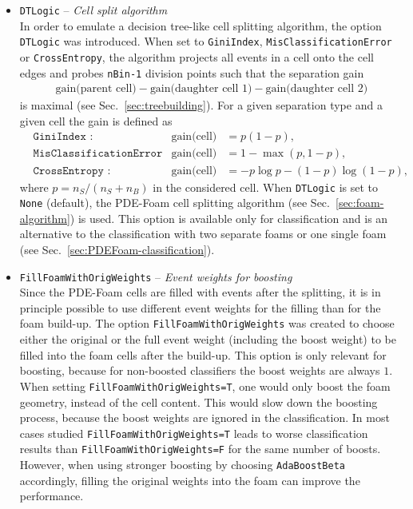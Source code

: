 \begin{itemize}
\item \texttt{DTLogic} -- {\em Cell split algorithm}\\
In order to emulate a decision tree-like cell splitting algorithm, the
option \texttt{DTLogic} was introduced.  When set to
\texttt{GiniIndex}, \texttt{MisClassificationError} or
\texttt{Cross\-En\-tro\-py}, the algorithm projects all events in a
cell onto the cell edges and probes \texttt{nBin-1} division points
such that the separation gain
\begin{align}
  \text{gain(parent cell)} -
  \text{gain(daughter cell 1)} 
  - \text{gain(daughter cell 2)}
\end{align}
is maximal (see Sec.~\ref{sec:treebuilding}).  For a given separation
type and a given cell the gain is defined as
\begin{align}
  &\texttt{GiniIndex :} & \text{gain(cell)}&=p(1-p),\\
  &\texttt{MisClassificationError :} & \text{gain(cell)}&=1-\max(p,1-p),\\
  &\texttt{CrossEntropy :} & \text{gain(cell)}&=-p\log p-(1-p)\log(1-p),
\end{align}
where $p=n_S/(n_S+n_B)$ in the considered cell.  When \texttt{DTLogic}
is set to \texttt{None} (default), the PDE-Foam cell splitting
algorithm (see Sec.~\ref{sec:foam-algorithm}) is used.  This option is
available only for classification and is an alternative to the
classification with two separate foams or one single foam (see
Sec.~\ref{sec:PDEFoam-classification}).


\item \texttt{FillFoamWithOrigWeights} -- {\em Event weights for boosting}\\
  Since the PDE-Foam cells are filled with events after the splitting,
  it is in principle possible to use different event weights for the
  filling than for the foam build-up.  The option
  \texttt{FillFoamWithOrigWeights} was created to choose either the
  original or the full event weight (including the boost weight) to be
  filled into the foam cells after the build-up.  This option is only
  relevant for boosting, because for non-boosted classifiers the boost
  weights are always $1$.  When setting
  \texttt{FillFoamWithOrigWeights=T}, one would only boost the foam
  geometry, instead of the cell content.  This would slow down the
  boosting process, because the boost weights are ignored in the
  classification.  In most cases studied
  \texttt{FillFoamWithOrigWeights=T} leads to worse classification
  results than \texttt{FillFoamWithOrigWeights=F} for the same number
  of boosts.  However, when using stronger boosting by choosing
  \texttt{AdaBoostBeta} accordingly, filling the original weights into
  the foam can improve the performance.
\end{itemize}

